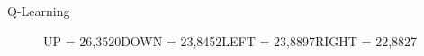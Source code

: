 \documentclass{beamer}
\begin{document}
\begin{frame}{Q-Learning}
\begin{figure}[hp]
  			\caption*{\scriptsize{\newline UP = 97,6530\newline DOWN = 100,0000\newline LEFT = 93,8538\newline RIGHT = 92,5261}}\label{fig:fb}
		\endminipage\hfill
   			\caption*{\scriptsize{\newline UP = 26,3520\newline DOWN = 23,8452\newline LEFT = 23,8897\newline RIGHT = 22,8827}}\label{fig:fc}
		\endminipage
	\end{figure}
\end{frame}
\end{document}
